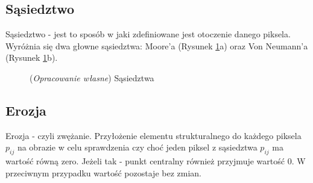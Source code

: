 \documentclass{article}
\begin{document}
        \subsection{Sąsiedztwo}
        {
            \label{sec:sasiedztwo}
            \Large
            \justifying
            \quad
            Sąsiedztwo - jest to sposób w jaki zdefiniowane jest otoczenie danego piksela.
            Wyróżnia się dwa głowne sąsiedztwa: Moore'a (Rysunek \ref{neighbourhood}a) oraz Von Neumann'a (Rysunek \ref{neighbourhood}b).
        }
        \begin{figure}[H]
            \centering
            \qquad
            \caption{(\textit{Opracowanie własne}) Sąsiedztwa}
            \label{neighbourhood}
        \end{figure}

        \subsection{Erozja}
        {
            \label{sec:erozja}
            \Large
            \justifying
            \quad
            Erozja - czyli zwężanie.
            Przyłożenie elementu strukturalnego do każdego piksela \(p_{ij}\) na obrazie w celu sprawdzenia czy choć jeden piksel z sąsiedztwa \(p_{ij}\) ma wartość równą zero.
            Jeżeli tak - punkt centralny również przyjmuje wartość 0. W przeciwnym przypadku wartość pozostaje bez zmian.
        }
\end{document}
